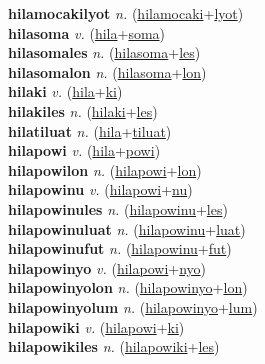 \textbf{hilamocakilyot} \textit{n.} (\hyperref[hilamocaki]{hilamocaki}+\hyperref[lyot]{lyot})
 \label{hilamocakilyot} \\
\textbf{hilasoma} \textit{v.} (\hyperref[hila]{hila}+\hyperref[soma]{soma})
 \label{hilasoma} \\
\textbf{hilasomales} \textit{n.} (\hyperref[hilasoma]{hilasoma}+\hyperref[les]{les})
 \label{hilasomales} \\
\textbf{hilasomalon} \textit{n.} (\hyperref[hilasoma]{hilasoma}+\hyperref[lon]{lon})
 \label{hilasomalon} \\
\textbf{hilaki} \textit{v.} (\hyperref[hila]{hila}+\hyperref[ki]{ki})
 \label{hilaki} \\
\textbf{hilakiles} \textit{n.} (\hyperref[hilaki]{hilaki}+\hyperref[les]{les})
 \label{hilakiles} \\
\textbf{hilatiluat} \textit{n.} (\hyperref[hila]{hila}+\hyperref[tiluat]{tiluat})
 \label{hilatiluat} \\
\textbf{hilapowi} \textit{v.} (\hyperref[hila]{hila}+\hyperref[powi]{powi})
 \label{hilapowi} \\
\textbf{hilapowilon} \textit{n.} (\hyperref[hilapowi]{hilapowi}+\hyperref[lon]{lon})
 \label{hilapowilon} \\
\textbf{hilapowinu} \textit{v.} (\hyperref[hilapowi]{hilapowi}+\hyperref[nu]{nu})
 \label{hilapowinu} \\
\textbf{hilapowinules} \textit{n.} (\hyperref[hilapowinu]{hilapowinu}+\hyperref[les]{les})
 \label{hilapowinules} \\
\textbf{hilapowinuluat} \textit{n.} (\hyperref[hilapowinu]{hilapowinu}+\hyperref[luat]{luat})
 \label{hilapowinuluat} \\
\textbf{hilapowinufut} \textit{n.} (\hyperref[hilapowinu]{hilapowinu}+\hyperref[fut]{fut})
 \label{hilapowinufut} \\
\textbf{hilapowinyo} \textit{v.} (\hyperref[hilapowi]{hilapowi}+\hyperref[nyo]{nyo})
 \label{hilapowinyo} \\
\textbf{hilapowinyolon} \textit{n.} (\hyperref[hilapowinyo]{hilapowinyo}+\hyperref[lon]{lon})
 \label{hilapowinyolon} \\
\textbf{hilapowinyolum} \textit{n.} (\hyperref[hilapowinyo]{hilapowinyo}+\hyperref[lum]{lum})
 \label{hilapowinyolum} \\
\textbf{hilapowiki} \textit{v.} (\hyperref[hilapowi]{hilapowi}+\hyperref[ki]{ki})
 \label{hilapowiki} \\
\textbf{hilapowikiles} \textit{n.} (\hyperref[hilapowiki]{hilapowiki}+\hyperref[les]{les})
